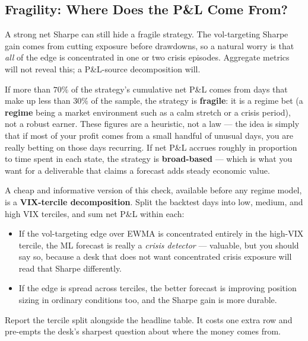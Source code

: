\subsection{Fragility: Where Does the P\&L Come From?}
\label{subsec:fragility}

A strong net Sharpe can still hide a fragile strategy. The vol-targeting Sharpe gain comes from cutting exposure before drawdowns, so a natural worry is that \emph{all} of the edge is concentrated in one or two crisis episodes. Aggregate metrics will not reveal this; a P\&L-source decomposition will.

\begin{keyidea}
If more than $70\%$ of the strategy's cumulative net P\&L comes from days that make up less than $30\%$ of the sample, the strategy is \textbf{fragile}: it is a regime bet (a \textbf{regime} being a market environment such as a calm stretch or a crisis period), not a robust earner. These figures are a heuristic, not a law --- the idea is simply that if most of your profit comes from a small handful of unusual days, you are really betting on those days recurring. If net P\&L accrues roughly in proportion to time spent in each state, the strategy is \textbf{broad-based} --- which is what you want for a deliverable that claims a forecast adds steady economic value.
\end{keyidea}

A cheap and informative version of this check, available before any regime model, is a \textbf{VIX-tercile decomposition}. Split the backtest days into low, medium, and high VIX terciles, and sum net P\&L within each:
\begin{itemize}[nosep]
  \item If the vol-targeting edge over EWMA is concentrated entirely in the high-VIX tercile, the ML forecast is really a \emph{crisis detector} --- valuable, but you should say so, because a desk that does not want concentrated crisis exposure will read that Sharpe differently.
  \item If the edge is spread across terciles, the better forecast is improving position sizing in ordinary conditions too, and the Sharpe gain is more durable.
\end{itemize}
Report the tercile split alongside the headline table. It costs one extra row and pre-empts the desk's sharpest question about where the money comes from.



